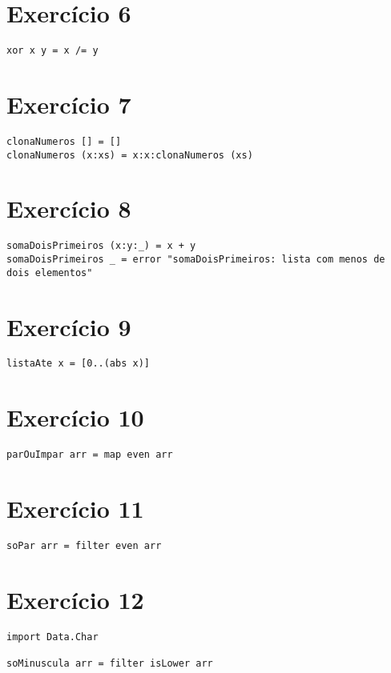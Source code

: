 \documentclass[12pt,a4paper,brazil]{article}
\begin{document}
\section*{Exercício 6}
\begin{lstlisting}
xor x y = x /= y
\end{lstlisting}

\section*{Exercício 7}
\begin{lstlisting}
clonaNumeros [] = []
clonaNumeros (x:xs) = x:x:clonaNumeros (xs)
\end{lstlisting}

\section*{Exercício 8}
\begin{lstlisting}
somaDoisPrimeiros (x:y:_) = x + y
somaDoisPrimeiros _ = error "somaDoisPrimeiros: lista com menos de dois elementos"
\end{lstlisting}

\section*{Exercício 9}
\begin{lstlisting}
listaAte x = [0..(abs x)]
\end{lstlisting}

\section*{Exercício 10}
\begin{lstlisting}
parOuImpar arr = map even arr
\end{lstlisting}

\section*{Exercício 11}
\begin{lstlisting}
soPar arr = filter even arr
\end{lstlisting}

\section*{Exercício 12}
\begin{lstlisting}
import Data.Char

soMinuscula arr = filter isLower arr
\end{lstlisting}
\end{document}
